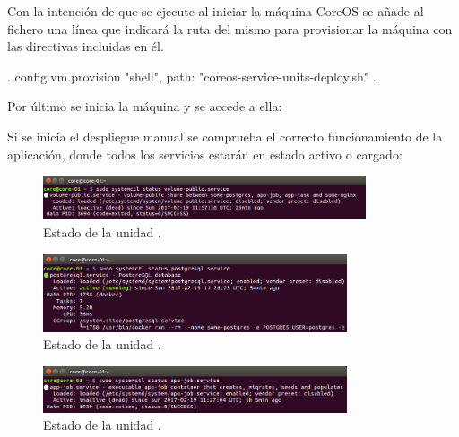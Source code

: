 Con la intención de que se ejecute al iniciar la máquina CoreOS se añade al fichero  una línea que indicará la ruta del mismo para provisionar la máquina con las directivas incluidas en él.

\begin{codelisting}
\label{code:vagrantfile3}
\begin{code}
.
config.vm.provision "shell", path: "coreos-service-units-deploy.sh"
.
\end{code}
\end{codelisting}

Por último se inicia la máquina y se accede a ella: 


Si se inicia el despliegue manual se comprueba el correcto funcionamiento de la aplicación, donde todos los servicios estarán en estado activo o cargado:

\begin{figure}[H]
\centering
\includegraphics[width=0.85\textwidth]{images/figures/volume-public.service.png}
\caption{Estado de la unidad .}
\end{figure}

\begin{figure}[H]
\centering
\includegraphics[width=0.8\textwidth]{images/figures/postgresql.service.png}
\caption{Estado de la unidad .}
\end{figure}

\begin{figure}[H]
\centering
\includegraphics[width=0.8\textwidth]{images/figures/app-job.service.png}
\caption{Estado de la unidad .}
\end{figure}

